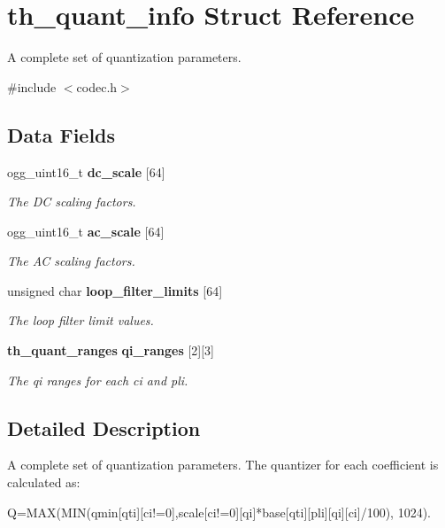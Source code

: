 \section{th\_\-quant\_\-info Struct Reference}
\label{structth__quant__info}


A complete set of quantization parameters.  


{\ttfamily \#include $<$codec.h$>$}\subsection*{Data Fields}
\begin{DoxyCompactItemize}
\item 
ogg\_\-uint16\_\-t {\bf dc\_\-scale} [64]
\begin{DoxyCompactList}\small\item\em The DC scaling factors. \item\end{DoxyCompactList}\item 
ogg\_\-uint16\_\-t {\bf ac\_\-scale} [64]
\begin{DoxyCompactList}\small\item\em The AC scaling factors. \item\end{DoxyCompactList}\item 
unsigned char {\bf loop\_\-filter\_\-limits} [64]
\begin{DoxyCompactList}\small\item\em The loop filter limit values. \item\end{DoxyCompactList}\item 
{\bf th\_\-quant\_\-ranges} {\bf qi\_\-ranges} [2][3]
\begin{DoxyCompactList}\small\item\em The {\itshape qi\/} ranges for each {\itshape ci\/} and {\itshape pli\/}. \item\end{DoxyCompactList}\end{DoxyCompactItemize}


\subsection{Detailed Description}
A complete set of quantization parameters. The quantizer for each coefficient is calculated as: 
\begin{DoxyCode}
    Q=MAX(MIN(qmin[qti][ci!=0],scale[ci!=0][qi]*base[qti][pli][qi][ci]/100),
     1024).
\end{DoxyCode}


